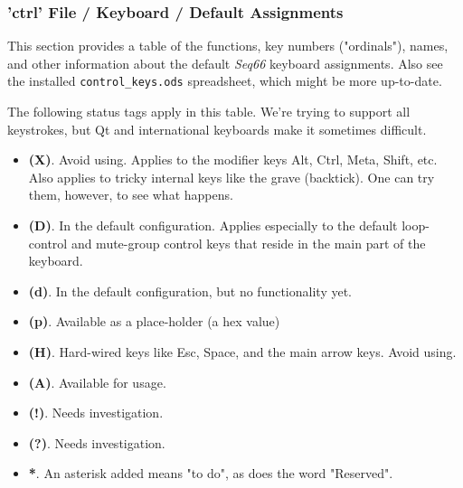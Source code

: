 %
%
%

\subsubsection{'ctrl' File / Keyboard / Default Assignments}
\label{subsubsec:ctrl_keyboard_default_assignments}

   This section provides a table of the functions, key numbers ("ordinals"),
   names, and other information about the default \textsl{Seq66}
   keyboard assignments.
   Also see the installed \texttt{control\_keys.ods} spreadsheet, which
   might be more up-to-date.

   The following status tags apply in this table.
   We're trying to support all keystrokes, but Qt and international keyboards
   make it sometimes difficult.

   \begin{itemize}
      \item \textbf{(X)}.
         Avoid using.  Applies to the modifier keys Alt, Ctrl, Meta, Shift, etc.
         Also applies to tricky internal keys like the grave (backtick).
         One can try them, however, to see what happens.
      \item \textbf{(D)}.
         In the default configuration. Applies especially to the default
         loop-control and mute-group control keys that reside in the main part of
         the keyboard.
      \item \textbf{(d)}.
         In the default configuration, but no functionality yet.
      \item \textbf{(p)}.
         Available as a place-holder (a hex value)
      \item \textbf{(H)}.
         Hard-wired keys like Esc, Space, and the main arrow keys.  Avoid using.
      \item \textbf{(A)}.
         Available for usage.
      \item \textbf{(!)}.
         Needs investigation.
      \item \textbf{(?)}.
         Needs investigation.
      \item \textbf{*}. An asterisk added means "to do", as does the word
         "Reserved".
   \end{itemize}

